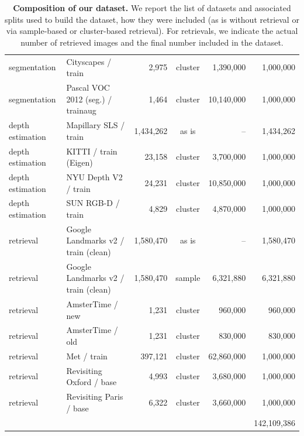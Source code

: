 \begin{table}
{\begin{tabular}{@{} l l r c r r @{}}
    segmentation            & Cityscapes / train                  &      2,975 & cluster   &  1,390,000 &  1,000,000 \\ 
    segmentation            & Pascal VOC 2012 (seg.) / trainaug   &      1,464 & cluster   & 10,140,000 &  1,000,000 \\ 
    \midrule
    depth estimation        & Mapillary SLS / train               &  1,434,262 & as is     & --         &  1,434,262 \\ 
    depth estimation        & KITTI / train (Eigen)               &     23,158 & cluster   &  3,700,000 &  1,000,000 \\ 
    depth estimation        & NYU Depth V2 / train                &     24,231 & cluster   & 10,850,000 &  1,000,000 \\ 
    depth estimation        & SUN RGB-D / train                   &      4,829 & cluster   &  4,870,000 &  1,000,000 \\ 
    \midrule
    retrieval               & Google Landmarks v2 / train (clean) &  1,580,470 & as is     & --         &  1,580,470 \\ 
    retrieval               & Google Landmarks v2 / train (clean) &  1,580,470 & sample    &  6,321,880 &  6,321,880 \\ 
    retrieval               & AmsterTime / new                    &      1,231 & cluster   &    960,000 &    960,000 \\ 
    retrieval               & AmsterTime / old                    &      1,231 & cluster   &    830,000 &    830,000 \\ 
    retrieval               & Met / train                         &    397,121 & cluster   & 62,860,000 &  1,000,000 \\ 
    retrieval               & Revisiting Oxford / base            &      4,993 & cluster   &  3,680,000 &  1,000,000 \\ 
    retrieval               & Revisiting Paris / base             &      6,322 & cluster   &  3,660,000 &  1,000,000 \\ 
    \bottomrule
                            &                                     &            &           &            & 142,109,386 \\
    \end{tabular}
    }
    \caption{
      \textbf{Composition of our \LaViDa{} dataset.} 
      We report the list of datasets and associated splits used to build the dataset, how they were included (as is without retrieval or via sample-based or cluster-based retrieval). 
      For retrievals, we indicate the actual number of retrieved images and the final number included in the dataset. 
      }
    \label{tab:lavida-details}
\end{table}

